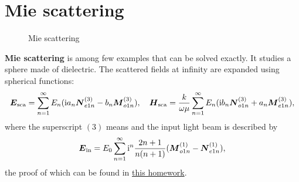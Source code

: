 \documentclass[hyperref, a4paper]{article}
\newcommand*{\ii}{\mathrm{i}}
\newcommand*{\concept}[1]{{\textbf{#1}}}
\begin{document}
\section{Mie scattering}

\begin{figure}
    \centering
    
    \caption{Mie scattering}
\end{figure}

\concept{Mie scattering} is among few examples that can be solved exactly. It studies a sphere made of 
dielectric. The scattered fields at infinity are expanded using spherical functions:
\begin{equation}
    \vb*{E}_\text{sca} = \sum_{n=1}^\infty E_n (\ii a_n \vb*{N}^{(3)}_{e1n} - b_n \vb*{M}^{(3)}_{o1n}), \quad 
    \vb*{H}_\text{sca} = \frac{k}{\omega \mu} \sum_{n=1}^\infty E_n (\ii b_n \vb*{N}^{(3)}_{o1n} + a_n \vb*{M}^{(3)}_{e1n}),
\end{equation}
where the superscript $(3)$ means %
and the input light beam is described by 
\begin{equation}
    \vb*{E}_\text{in} = E_0 \sum_{n=1}^\infty \ii^n \frac{2n+1}{n(n+1)} (\vb*{M}^{(1)}_{o1n} - \vb*{N}^{(1)}_{e1n}),
\end{equation}
the proof of which can be found in \href{../advanced-electrodynsmics-homework/1.pdf}{this homework}.
\end{document}
